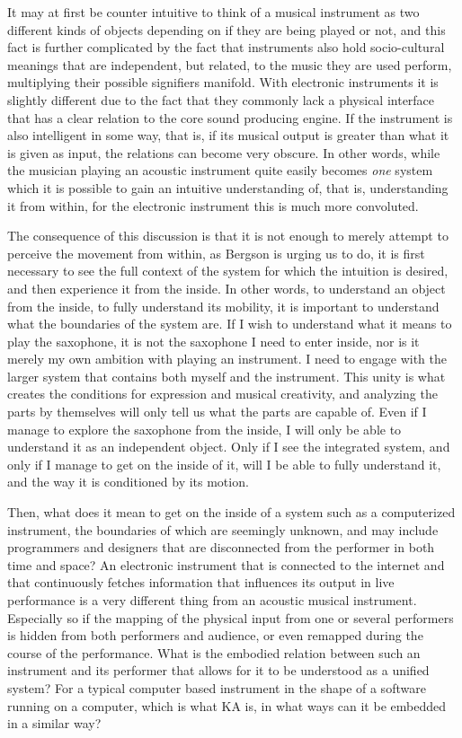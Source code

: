 \documentclass[11pt]{article}
\begin{document}
It may at first be counter intuitive to think of a musical instrument as two different kinds of objects depending on if they are being played or not, and this fact is further complicated by the fact that instruments also hold socio-cultural meanings that are independent, but related, to the music they are used perform, multiplying their possible signifiers manifold. With electronic instruments it is slightly different due to the fact that they commonly lack a physical interface that has a clear relation to the core sound producing engine. If the instrument is also intelligent in some way, that is, if its musical output is greater than what it is given as input, the relations can become very obscure. In other words, while the musician playing an acoustic instrument quite easily becomes \emph{one} system which it is possible to gain an intuitive understanding of, that is, understanding it from within, for the electronic instrument this is much more convoluted.

The consequence of this discussion is that it is not enough to merely attempt to perceive the movement from within, as Bergson is urging us to do, it is first necessary to see the full context of the system for which the intuition is desired, and then experience it from the inside. In other words, to understand an object from the inside, to fully understand its mobility, it is important to understand what the boundaries of the system are. If I wish to understand what it means to play the saxophone, it is not the saxophone I need to enter inside, nor is it merely my own ambition with playing an instrument. I need to engage with the larger system that contains both myself and the instrument. This unity is what creates the conditions for expression and musical creativity, and analyzing the parts by themselves will only tell us what the parts are capable of. Even if I manage to explore the saxophone from the inside, I will only be able to understand it as an independent object. Only if I see the integrated system, and only if I manage to get on the inside of it, will I be able to fully understand it, and the way it is conditioned by its motion.

Then, what does it mean to get on the inside of a system such as a computerized instrument, the boundaries of which are seemingly unknown, and may include programmers and designers that are disconnected from the performer in both time and space? An electronic instrument that is connected to the internet and that continuously fetches information that influences its output in live performance is a very different thing from an acoustic musical instrument. Especially so if the mapping of the physical input from one or several performers is hidden from both performers and audience, or even remapped during the course of the performance. What is the embodied relation between such an instrument and its performer that allows for it to be understood as a unified system? For a typical computer based instrument in the shape of a software running on a computer, which is what KA is, in what ways can it be embedded in a similar way?
\end{document}
